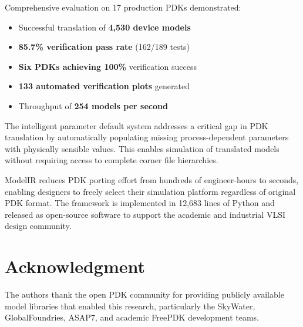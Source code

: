 \documentclass[conference]{IEEEtran}
\begin{document}
Comprehensive evaluation on 17 production PDKs demonstrated:
\begin{itemize}
\item Successful translation of \textbf{4,530 device models}
\item \textbf{85.7\% verification pass rate} (162/189 tests)
\item \textbf{Six PDKs achieving 100\%} verification success
\item \textbf{133 automated verification plots} generated
\item Throughput of \textbf{254 models per second}
\end{itemize}

The intelligent parameter default system addresses a critical gap in PDK translation by automatically populating missing process-dependent parameters with physically sensible values. This enables simulation of translated models without requiring access to complete corner file hierarchies.

ModelIR reduces PDK porting effort from hundreds of engineer-hours to seconds, enabling designers to freely select their simulation platform regardless of original PDK format. The framework is implemented in 12,683 lines of Python and released as open-source software to support the academic and industrial VLSI design community.

\section*{Acknowledgment}

The authors thank the open PDK community for providing publicly available model libraries that enabled this research, particularly the SkyWater, GlobalFoundries, ASAP7, and academic FreePDK development teams.
\end{document}
